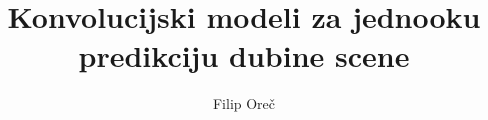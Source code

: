\documentclass[times, utf8, zavrsni, numeric]{fer}
\begin{document}

\title{Konvolucijski modeli za jednooku predikciju dubine scene}

\author{Filip Oreč}

\maketitle

\izvornik


\tableofcontents
\end{document}
